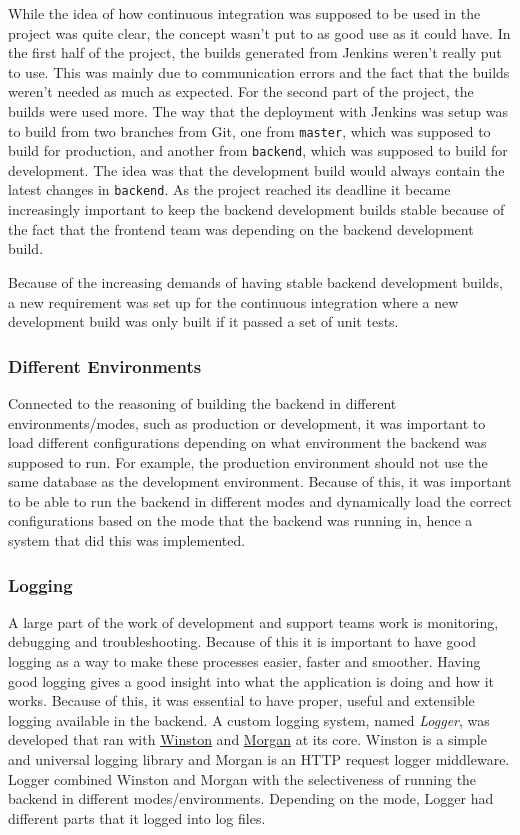 While the idea of how continuous integration was supposed to be used in the project was quite clear, the concept wasn't put to as good use as it could have. In the first half of the project, the builds generated from Jenkins weren't really put to use. This was mainly due to communication errors and the fact that the builds weren't needed as much as expected. For the second part of the project, the builds were used more. The way that the deployment with Jenkins was setup was to build from two branches from Git, one from \texttt{master}, which was supposed to build for production, and another from \texttt{backend}, which was supposed to build for development. The idea was that the development build would always contain the latest changes in \texttt{backend}. As the project reached its deadline it became increasingly important to keep the backend development builds stable because of the fact that the frontend team was depending on the backend development build.

Because of the increasing demands of having stable backend development builds, a new requirement was set up for the continuous integration where a new development build was only built if it passed a set of unit tests.

\subsubsection{Different Environments}
Connected to the reasoning of building the backend in different environments/modes, such as production or development, it was important to load different configurations depending on what environment the backend was supposed to run. For example, the production environment should not use the same database as the development environment. Because of this, it was important to be able to run the backend in different modes and dynamically load the correct configurations based on the mode that the backend was running in, hence a system that did this was implemented.

\subsubsection{Logging} \label{logging}
A large part of the work of development and support teams work is monitoring, debugging and troubleshooting. Because of this it is important to have good logging as a way to make these processes easier, faster and smoother. Having good logging gives a good insight into what the application is doing and how it works. Because of this, it was essential to have proper, useful and extensible logging available in the backend. A custom logging system, named \emph{Logger}, was developed that ran with \href{https://github.com/winstonjs/winston}{Winston} and \href{https://github.com/expressjs/morgan}{Morgan} at its core. Winston is a simple and universal logging library and Morgan is an HTTP request logger middleware. Logger combined Winston and Morgan with the selectiveness of running the backend in different modes/environments. Depending on the mode, Logger had different parts that it logged into log files.

